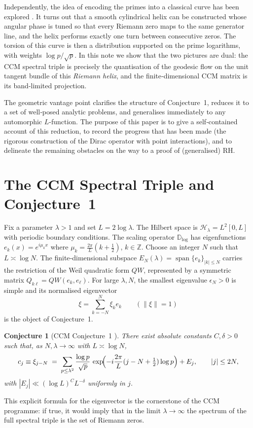 \documentclass[12pt,a4paper]{article}
\newtheorem{conjecture}[theorem]{Conjecture}
\newcommand{\Z}{\mathbb{Z}}
\begin{document}
Independently, the idea of encoding the primes into a classical curve has been explored \cite{HelixNote}.  It turns out that a smooth cylindrical helix can be constructed whose angular phase is tuned so that every Riemann zero maps to the same generator line, and the helix performs exactly one turn between consecutive zeros.  The torsion of this curve is then a distribution supported on the prime logarithms, with weights $\log p / \sqrt{p}$.  In this note we show that the two pictures are dual: the CCM spectral triple is precisely the quantisation of the geodesic flow on the unit tangent bundle of this \emph{Riemann helix}, and the finite‑dimensional CCM matrix is its band‑limited projection.

The geometric vantage point clarifies the structure of Conjecture~1, reduces it to a set of well‑posed analytic problems, and generalises immediately to any automorphic $L$-function.  The purpose of this paper is to give a self‑contained account of this reduction, to record the progress that has been made (the rigorous construction of the Dirac operator with point interactions), and to delineate the remaining obstacles on the way to a proof of (generalised) RH.

\section{The CCM Spectral Triple and Conjecture~1}
Fix a parameter $\lambda>1$ and set $L = 2\log\lambda$.  The Hilbert space is $\mathcal{H}_\lambda = L^2[0,L]$ with periodic boundary conditions.  The scaling operator $\mathbb{D}_{\log}$ has eigenfunctions $e_k(x)=e^{i\mu_k x}$ where $\mu_k = \frac{2\pi}{L}(k+\frac12)$, $k\in\Z$.  Choose an integer $N$ such that $L \asymp \log N$.  The finite‑dimensional subspace $E_N(\lambda)=\operatorname{span}\{e_k\}_{|k|\le N}$ carries the restriction of the Weil quadratic form $QW$, represented by a symmetric matrix $Q_{k\ell}=QW(e_k,e_\ell)$.  For large $\lambda,N$, the smallest eigenvalue $\epsilon_N>0$ is simple and its normalised eigenvector
\[
\xi = \sum_{k=-N}^N \xi_k e_k \qquad(\|\xi\|=1)
\]
is the object of Conjecture~1.

\begin{conjecture}[CCM Conjecture~1 \cite{CCM2025}]
There exist absolute constants $C,\delta>0$ such that, as $N,\lambda\to\infty$ with $L\asymp\log N$,
\[
c_j \equiv \xi_{j-N} \;=\; \sum_{p\le\lambda^2}\frac{\log p}{\sqrt{p}}\,
      \exp\!\Bigl(-i\frac{2\pi}{L}(j-N+\tfrac12)\log p\Bigr) + E_j,
\qquad |j|\le 2N,
\]
with $|E_j|\ll (\log L)^C L^{-\delta}$ uniformly in $j$.
\end{conjecture}
This explicit formula for the eigenvector is the cornerstone of the CCM programme: if true, it would imply that in the limit $\lambda\to\infty$ the spectrum of the full spectral triple is the set of Riemann zeros.
\end{document}
